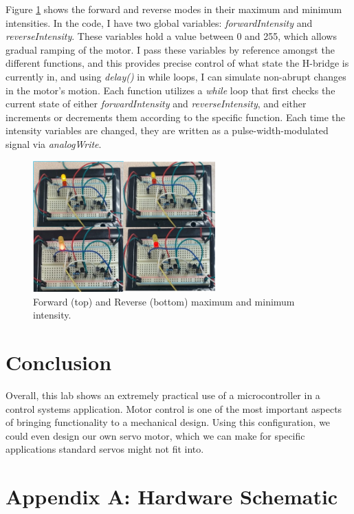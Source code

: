 \documentclass{IEEEtran}
\begin{document}
Figure \ref{fig:modes} shows the forward and reverse modes in their maximum and minimum intensities. In the code, I have two global variables: \textit{forwardIntensity} and \textit{reverseIntensity}. These variables hold a value between 0 and 255, which allows gradual ramping of the motor. I pass these variables by reference amongst the different functions, and this provides precise control of what state the H-bridge is currently in, and using \textit{delay()} in while loops, I can simulate non-abrupt changes in the motor's motion. Each function utilizes a \textit{while} loop that first checks the current state of either \textit{forwardIntensity} and \textit{reverseIntensity}, and either increments or decrements them according to the specific function. Each time the intensity variables are changed, they are written as a pulse-width-modulated signal via \textit{analogWrite}. 

\begin{figure}[!ht] 
    \centering
    \includegraphics[width = 7cm]{dcmotormodes.jpg}
    \caption{Forward (top) and Reverse (bottom) maximum and minimum intensity.}
    \label{fig:modes}
\end{figure}

\section{Conclusion}

Overall, this lab shows an extremely practical use of a microcontroller in a control systems application. Motor control is one of the most important aspects of bringing functionality to a mechanical design. Using this configuration, we could even design our own servo motor, which we can make for specific applications standard servos might not fit into.

\section*{Appendix A: Hardware Schematic}
\end{document}
